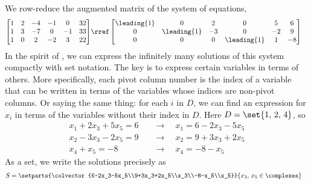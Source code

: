 We row-reduce the augmented matrix of the system of equations,
%
\begin{align*}
\begin{bmatrix}
 1 & 2 & -4 & -1 & 0 & 32 \\
 1 & 3 & -7 & 0 & -1 & 33 \\
 1 & 0 & 2 & -2 & 3 & 22
\end{bmatrix}
&\rref
\begin{bmatrix}
 \leading{1} & 0 & 2 & 0 & 5 & 6 \\
 0 & \leading{1} & -3 & 0 & -2 & 9 \\
 0 & 0 & 0 & \leading{1} & 1 & -8
\end{bmatrix}
\end{align*}
%
In the spirit of , we can express the infinitely many solutions of this system compactly with set notation.  The key is to express certain variables in terms of others.  More specifically, each pivot column number is the index of a variable that can be written in terms of the variables whose indices are non-pivot columns.  Or saying the same thing: for each $i$ in $D$, we can find an expression for $x_i$ in terms of the variables without their index in $D$.  Here $D=\set{1,\,2,\,4}$, so
%
\begin{align*}
x_1+2x_3+5x_5=6
\quad&\rightarrow\quad x_1=6-2x_3-5x_5\\
%
x_2-3x_3-2x_5=9
\quad&\rightarrow\quad x_2=9+3x_3+2x_5\\
%
x_4+x_5=-8\quad&\rightarrow\quad x_4=-8-x_5
%
\end{align*}
%
As a set, we write the solutions precisely as
%
\begin{align*}
S&=\setparts{\colvector{6-2x_3-5x_5\\9+3x_3+2x_5\\x_3\\-8-x_5\\x_5}}{x_3,\,x_5\in\complexes}
\end{align*}
%
